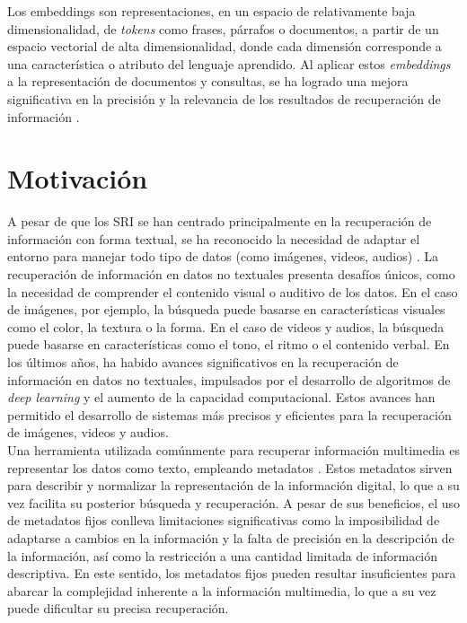 Los embeddings son representaciones, en un espacio de relativamente baja dimensionalidad, de \textit{tokens} como frases, párrafos o documentos, a partir de un espacio vectorial de alta dimensionalidad, donde cada dimensión corresponde a una característica o atributo del lenguaje aprendido. Al aplicar estos \textit{embeddings} a la representación de documentos y consultas, se ha logrado una mejora significativa en la precisión y la relevancia de los resultados de recuperación de información \cite{docEmbReview}.\\ 

\section{Motivación}
\label{sec:motivation}

A pesar de que los SRI se han centrado principalmente en la recuperación de información con forma textual, se ha reconocido la necesidad de adaptar el entorno para manejar todo tipo de datos (como imágenes, videos, audios) \cite{JianMMIR}. La recuperación de información en datos no textuales presenta desafíos únicos, como la necesidad de comprender el contenido visual o auditivo de los datos. En el caso de imágenes, por ejemplo, la búsqueda puede basarse en características visuales como el color, la textura o la forma. En el caso de videos y audios, la búsqueda puede basarse en características como el tono, el ritmo o el contenido verbal. En los últimos años, ha habido avances significativos en la recuperación de información en datos no textuales, impulsados por el desarrollo de algoritmos de \textit{deep learning} y el aumento de la capacidad computacional. %
Estos avances han permitido el desarrollo de sistemas más precisos y eficientes para la recuperación de imágenes, videos y audios.\\
Una herramienta utilizada comúnmente para recuperar información multimedia es representar los datos como texto, empleando metadatos \cite{Doh2022TowardUT}.
Estos metadatos sirven para describir y normalizar la representación de la información digital, lo que a su vez facilita su posterior búsqueda y recuperación. A pesar de sus beneficios, el uso de metadatos fijos conlleva limitaciones significativas como la imposibilidad de adaptarse a cambios en la información y la falta de precisión en la descripción de la información, así como la restricción a una cantidad limitada de información descriptiva. En este sentido, los metadatos fijos pueden resultar insuficientes para abarcar la complejidad inherente a la información multimedia, lo que a su vez puede dificultar su precisa recuperación. \\
